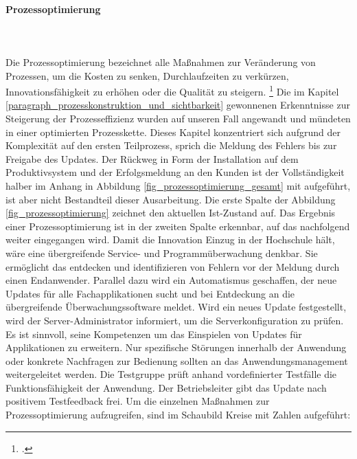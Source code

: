 \paragraph{Prozessoptimierung}\mbox{}\\\\
Die Prozessoptimierung bezeichnet alle Maßnahmen zur Veränderung von Prozessen, um die Kosten zu senken, Durchlaufzeiten zu verkürzen, Innovationsfähigkeit zu erhöhen oder die Qualität zu steigern. \footcite[Vgl.][280]{heinrich_stelzer_2011}
Die im Kapitel \ref{paragraph_prozesskonstruktion_und_sichtbarkeit} gewonnenen Erkenntnisse zur Steigerung der Prozesseffizienz wurden auf unseren Fall angewandt und mündeten in einer optimierten Prozesskette. Dieses Kapitel konzentriert sich aufgrund der Komplexität auf den ersten Teilprozess, sprich die Meldung des Fehlers bis zur Freigabe des Updates. Der Rückweg in Form der Installation auf dem Produktivsystem und der Erfolgsmeldung an den Kunden ist der Vollständigkeit halber im Anhang in Abbildung 
\ref{fig_prozessoptimierung_gesamt} mit aufgeführt, ist aber nicht Bestandteil dieser Ausarbeitung. 
Die erste Spalte der Abbildung \ref{fig_prozessoptimierung} zeichnet den aktuellen Ist-Zustand auf. Das Ergebnis einer Prozessoptimierung ist in der zweiten Spalte erkennbar, auf das nachfolgend weiter eingegangen wird. Damit die Innovation Einzug in der Hochschule hält, wäre eine übergreifende Service- und Programmüberwachung denkbar. Sie ermöglicht das entdecken und identifizieren von Fehlern vor der Meldung durch einen Endanwender. Parallel dazu wird ein Automatismus geschaffen, der neue Updates für alle Fachapplikationen sucht und bei Entdeckung an die übergreifende Überwachungssoftware meldet. Wird ein neues Update festgestellt, wird der Server-Administrator informiert, um die Serverkonfiguration zu prüfen. Es ist sinnvoll, seine Kompetenzen um das Einspielen von Updates für Applikationen zu erweitern. Nur spezifische Störungen innerhalb der Anwendung oder konkrete Nachfragen zur Bedienung sollten an das Anwendungsmanagement weitergeleitet werden.  Die Testgruppe prüft anhand vordefinierter Testfälle die Funktionsfähigkeit der Anwendung. Der Betriebsleiter gibt das Update nach positivem Testfeedback frei.
Um die einzelnen Maßnahmen zur Prozessoptimierung aufzugreifen, sind im Schaubild Kreise mit Zahlen aufgeführt:

